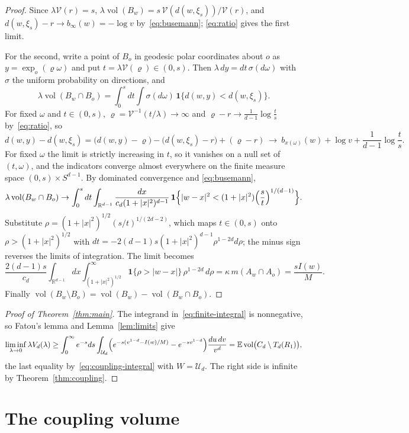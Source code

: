 \documentclass[11pt]{amsart}
\theoremstyle{remark}
\newcommand{\R}{\mathbb{R}}
\newcommand{\E}{\mathbb{E}}
\newcommand{\vol}{\operatorname{vol}}
\begin{document}
\begin{proof}
Since $\lambda\mathcal V(r)=s$, $\lambda\vol(B_w)=s\,\mathcal V(d(w,\xi_s))/\mathcal V(r)$, and $d(w,\xi_s)-r\to
b_\infty(w)=-\log v$ by~\eqref{eq:busemann}; \eqref{eq:ratio} gives the first limit.

For the second, write a point of $B_o$ in geodesic polar coordinates about $o$ as $y=\exp_o(\varrho\omega)$ and put
$t=\lambda\mathcal V(\varrho)\in(0,s)$. Then $\lambda\,dy=dt\,\sigma(d\omega)$ with $\sigma$ the uniform probability on
directions, and
\[
\lambda\vol(B_w\cap B_o)=\int_0^s dt\int\sigma(d\omega)\,\mathbf 1\{d(w,y)<d(w,\xi_s)\} .
\]
For fixed $\omega$ and $t\in(0,s)$, $\varrho=\mathcal V^{-1}(t/\lambda)\to\infty$ and $\varrho-r\to\frac1{d-1}\log
\frac ts$ by~\eqref{eq:ratio}, so
\[
d(w,y)-d(w,\xi_s)=\bigl(d(w,y)-\varrho\bigr)-\bigl(d(w,\xi_s)-r\bigr)+(\varrho-r)\ \to\ b_{x(\omega)}(w)+\log
v+\frac1{d-1}\log\frac ts .
\]
For fixed $\omega$ the limit is strictly increasing in $t$, so it vanishes on a null set of $(t,\omega)$, and the
indicators converge almost everywhere on the finite measure space $(0,s)\times S^{d-1}$. By dominated convergence and
\eqref{eq:busemann},
\[
\lambda\vol(B_w\cap B_o)\to\int_0^s dt\int_{\R^{d-1}}\frac{dx}{c_d(1+|x|^2)^{d-1}}\,
\mathbf 1\Bigl\{|w-x|^2<(1+|x|^2)\Bigl(\frac st\Bigr)^{1/(d-1)}\Bigr\} .
\]
Substitute $\rho=(1+|x|^2)^{1/2}(s/t)^{1/(2d-2)}$, which maps $t\in(0,s)$ onto $\rho>(1+|x|^2)^{1/2}$ with
$dt=-2(d-1)s(1+|x|^2)^{d-1}\rho^{1-2d}d\rho$; the minus sign reverses the limits of integration. The limit becomes
\[
\frac{2(d-1)s}{c_d}\int_{\R^{d-1}}dx\int_{(1+|x|^2)^{1/2}}^\infty\mathbf 1\{\rho>|w-x|\}\,\rho^{1-2d}\,d\rho
=\kappa\,m(A_w\cap A_o)=\frac{sI(w)}M .
\]
Finally $\vol(B_w\setminus B_o)=\vol(B_w)-\vol(B_w\cap B_o)$.
\end{proof}

\begin{proof}[Proof of Theorem~\ref{thm:main}]
The integrand in~\eqref{eq:finite-integral} is nonnegative, so Fatou's lemma and Lemma~\ref{lem:limits} give
\[
\liminf_{\lambda\to0}\lambda V_d(\lambda)\ge\int_0^\infty e^{-s}ds\int_{\mathcal U_d}\Bigl(e^{-s(v^{1-d}-I(w)/M)}-
e^{-sv^{1-d}}\Bigr)\frac{du\,dv}{v^d}=\E\vol\bigl(C_d\setminus T_d(R_1)\bigr),
\]
the last equality by~\eqref{eq:coupling-integral} with $W=\mathcal U_d$. The right side is infinite by
Theorem~\ref{thm:coupling}.
\end{proof}

\section{The coupling volume}\label{sec:coupling}
\end{document}
